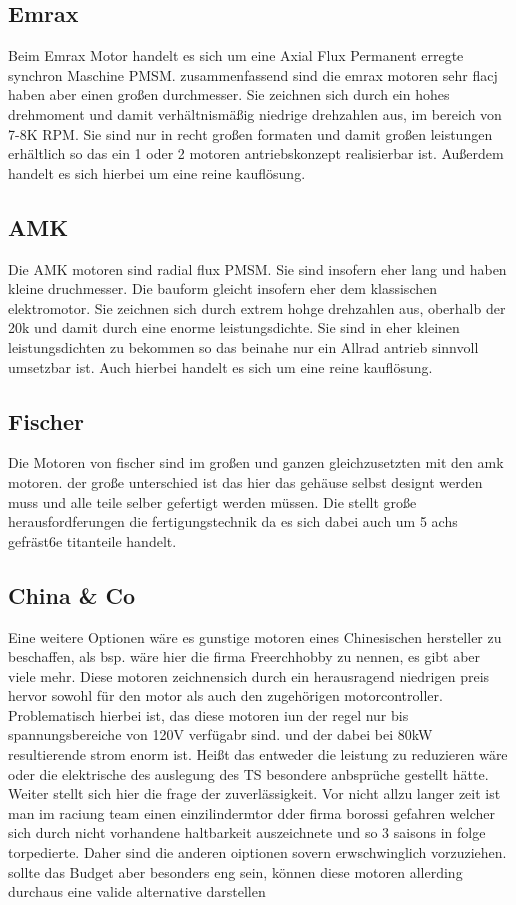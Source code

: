 \subsection{Emrax}
Beim Emrax Motor handelt es sich um eine Axial Flux Permanent erregte synchron Maschine PMSM. zusammenfassend sind die emrax motoren sehr flacj haben aber einen großen durchmesser. Sie zeichnen sich durch ein hohes drehmoment und damit verhältnismäßig niedrige drehzahlen aus, im bereich von 7-8K RPM. Sie sind nur in recht großen formaten und damit großen leistungen erhältlich so das ein 1 oder 2 motoren antriebskonzept realisierbar ist. Außerdem handelt es sich hierbei um eine reine kauflösung. 

\subsection{AMK}
Die AMK motoren sind radial flux PMSM. Sie sind insofern eher lang und haben kleine druchmesser. Die bauform gleicht insofern eher dem klassischen elektromotor. Sie zeichnen sich durch extrem hohge drehzahlen aus, oberhalb der 20k und damit durch eine enorme leistungsdichte. Sie sind in eher kleinen leistungsdichten zu bekommen so das beinahe nur ein Allrad antrieb sinnvoll umsetzbar ist. Auch hierbei handelt es sich um eine reine kauflösung. 

\subsection{Fischer}
Die Motoren von fischer sind im großen und ganzen gleichzusetzten mit den amk motoren. der große unterschied ist das hier das gehäuse selbst designt werden muss und alle teile selber gefertigt werden müssen. Die stellt große herausfordferungen die fertigungstechnik da es sich dabei auch um 5 achs gefräst6e titanteile handelt. 

\subsection{China \& Co}
Eine weitere Optionen wäre es gunstige motoren eines Chinesischen hersteller zu beschaffen, als bsp. wäre hier die firma Freerchhobby zu nennen, es gibt aber viele mehr. Diese motoren zeichnensich durch ein herausragend niedrigen preis hervor sowohl für den motor als auch den zugehörigen motorcontroller. Problematisch hierbei ist, das diese motoren iun der regel nur bis spannungsbereiche von 120V verfügabr sind. und der dabei bei 80kW resultierende strom enorm ist. Heißt das entweder die leistung zu reduzieren wäre oder die elektrische des auslegung des TS besondere anbsprüche gestellt hätte. Weiter stellt sich hier die frage der zuverlässigkeit. Vor nicht allzu langer zeit ist man im raciung team einen einzilindermtor dder firma borossi gefahren welcher sich durch nicht vorhandene haltbarkeit auszeichnete und so 3 saisons in folge torpedierte. Daher sind die anderen oiptionen sovern erwschwinglich vorzuziehen. sollte das Budget aber besonders eng sein, können diese motoren allerding durchaus eine valide alternative darstellen

